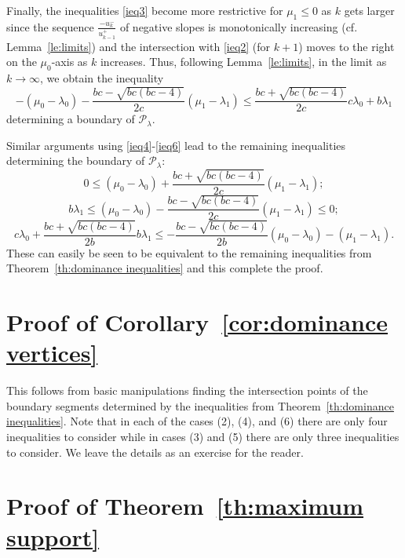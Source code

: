 \documentclass{amsart}
\numberwithin{theorem}{section}
\newcommand{\cP}{\mathcal{P}}
\begin{document}
  Finally, the inequalities \eqref{ieq3} become more restrictive for $\mu_1\le0$ as $k$ gets larger since the sequence $\frac{-u_k^-}{u_{k-1}^+}$ of negative slopes is monotonically increasing (cf. Lemma~\ref{le:limits}) and the intersection with \eqref{ieq2} (for $k+1$) moves to the right on the $\mu_0$-axis as $k$ increases.
  Thus, following Lemma~\ref{le:limits}, in the limit as $k\to\infty$, we obtain the inequality
  \[ -(\mu_0-\lambda_0)-\frac{bc-\sqrt{bc(bc-4)}}{2c}(\mu_1-\lambda_1) \le \frac{bc+\sqrt{bc(bc-4)}}{2c}c\lambda_0+b\lambda_1 \]
  determining a boundary of $\cP_\lambda$.

  Similar arguments using \eqref{ieq4}-\eqref{ieq6} lead to the remaining inequalities determining the boundary of $\cP_\lambda$:
  \[ 0 \le (\mu_0-\lambda_0)+\frac{bc+\sqrt{bc(bc-4)}}{2c}(\mu_1-\lambda_1);\]
  \[ b\lambda_1 \le (\mu_0-\lambda_0)-\frac{bc-\sqrt{bc(bc-4)}}{2c}(\mu_1-\lambda_1) \le 0;\]
  \[ c\lambda_0+\frac{bc+\sqrt{bc(bc-4)}}{2b}b\lambda_1 \le -\frac{bc-\sqrt{bc(bc-4)}}{2b}(\mu_0-\lambda_0)-(\mu_1-\lambda_1).\]
  These can easily be seen to be equivalent to the remaining inequalities from Theorem~\ref{th:dominance inequalities} and this complete the proof.


\section{Proof of Corollary~\ref{cor:dominance vertices}}
\label{sec:dominance vertices}

  This follows from basic manipulations finding the intersection points of the boundary segments determined by the inequalities from Theorem~\ref{th:dominance inequalities}.
  Note that in each of the cases (2), (4), and (6) there are only four inequalities to consider while in cases (3) and (5) there are only three inequalities to consider.
  We leave the details as an exercise for the reader.


\section{Proof of Theorem~\ref{th:maximum support}}
\label{sec:maximum support} 
\end{document}
